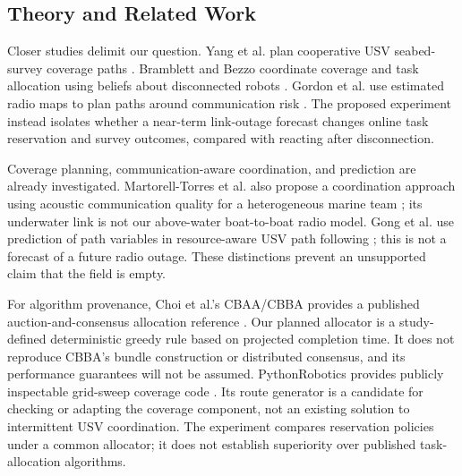\subsection{Theory and Related Work}
Closer studies delimit our question. Yang et al. plan cooperative USV seabed-survey coverage paths \cite{yang2023cooperative}. Bramblett and Bezzo coordinate coverage and task allocation using beliefs about disconnected robots \cite{bramblett2023epistemic}. Gordon et al. use estimated radio maps to plan paths around communication risk \cite{gordon2026communication}. The proposed experiment instead isolates whether a near-term link-outage forecast changes online task reservation and survey outcomes, compared with reacting after disconnection.

Coverage planning, communication-aware coordination, and prediction are already investigated. Martorell-Torres et al. also propose a coordination approach using acoustic communication quality for a heterogeneous marine team \cite{martorell2024coordination}; its underwater link is not our above-water boat-to-boat radio model. Gong et al. use prediction of path variables in resource-aware USV path following \cite{gong2022resource}; this is not a forecast of a future radio outage. These distinctions prevent an unsupported claim that the field is empty.

For algorithm provenance, Choi et al.'s CBAA/CBBA provides a published auction-and-consensus allocation reference \cite{choi2009auction}. Our planned allocator is a study-defined deterministic greedy rule based on projected completion time. It does not reproduce CBBA's bundle construction or distributed consensus, and its performance guarantees will not be assumed. PythonRobotics provides publicly inspectable grid-sweep coverage code \cite{sakai2018pythonrobotics}. Its route generator is a candidate for checking or adapting the coverage component, not an existing solution to intermittent USV coordination. The experiment compares reservation policies under a common allocator; it does not establish superiority over published task-allocation algorithms.
